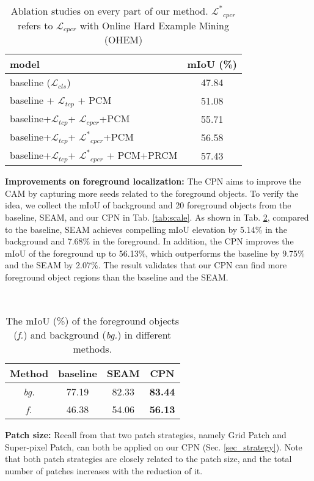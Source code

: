 \documentclass[10pt,twocolumn,letterpaper]{article}
\begin{document}
\begin{table}[!htbp]\small
\centering\
\begin{tabular}{lc}
\hline
model& mIoU (\%)\\
\hline
baseline ($ \mathcal {L}_{cls}$)   &     47.84\\
\hline
baseline + $ \mathcal {L}_{tcp}$ + PCM & 51.08\\
baseline+$ \mathcal {L}_{tcp}$+ $\mathcal {L}_{cpcr}$+PCM & 55.71\\
baseline+$ \mathcal {L}_{tcp}$+ $\mathcal {L^{*}}_{cpcr}$+PCM & 56.58\\
baseline+$ \mathcal {L}_{tcp}$+ $\mathcal {L^{*}}_{cpcr}$ + PCM+PRCM & 57.43\\
\hline
\end{tabular}
\caption{Ablation studies on every part of our method. $\mathcal {L^{*}}_{cpcr}$ refers to $\mathcal {L}_{cpcr}$ with Online Hard Example Mining (OHEM) }
\label{tab:ablation on cpn}
\end{table}

\noindent\textbf{Improvements on foreground localization:}\; The CPN aims to improve the CAM by capturing more seeds related to the foreground objects. To verify the idea, we collect the mIoU of background and 20 foreground objects from the baseline, SEAM, and our CPN in Tab. \ref{tab:scale}. As shown in Tab. \ref{tab:ablation on fb}, compared to the baseline, SEAM achieves compelling mIoU elevation by 5.14\% in the background and 7.68\% in the foreground. In addition, the CPN improves the mIoU of the foreground up to 56.13\%, which outperforms the baseline by 9.75\% and the SEAM by 2.07\%. The result validates that our CPN can find more foreground object regions than the baseline and the SEAM.
\begin{table}[!htbp]\small
\centering\
\begin{tabular}{c|c|c|c}
\hline
Method & baseline & SEAM & CPN \\
\hline
 \textit{bg.} & 77.19 & 82.33 & \textbf{83.44} \\
 \textit{f.} & 46.38 & 54.06 & \textbf{56.13} \\
\hline
\end{tabular}
\caption{The mIoU (\%) of the foreground objects (\textit{f.}) and background (\textit{bg.}) in different methods. }
\label{tab:ablation on fb}
\vspace{-2mm}
\end{table}

\noindent\textbf{Patch size:}\; Recall from that two patch strategies, namely Grid Patch and Super-pixel Patch, can both be applied on our CPN (Sec. \ref{sec_strategy}). Note that both patch strategies are closely related to the patch size, and the total number of patches increases with the reduction of it.
\end{document}
